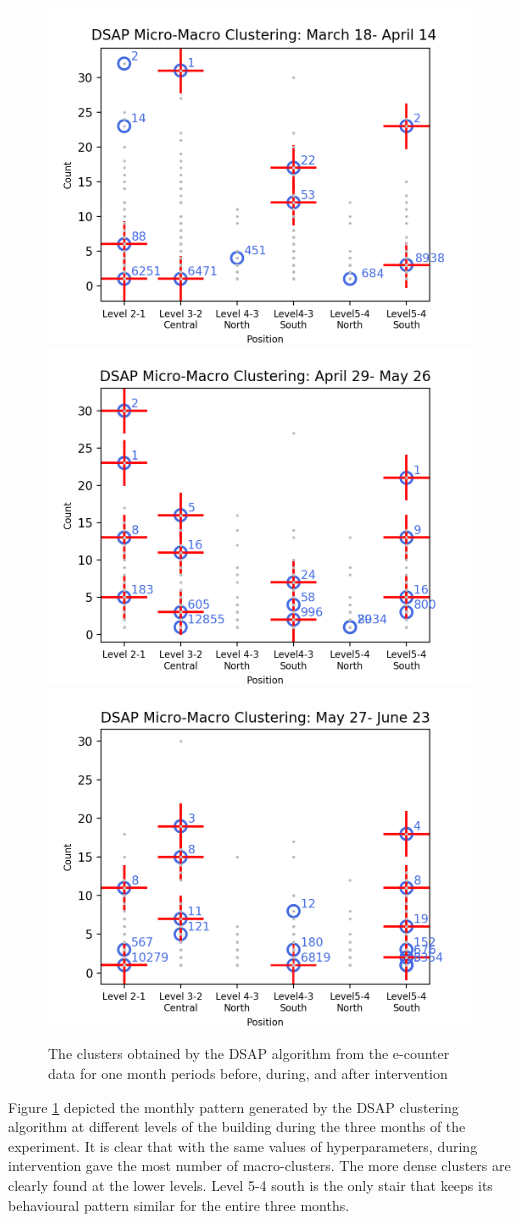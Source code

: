\begin{figure}[!t]
    \centering
    \includegraphics[width=.47\textwidth]{image/Chapters/Chapter6/BeforeInte1month.png}
    \includegraphics[width=.47\textwidth]{image/Chapters/Chapter6/duringInte1month.png}
    \includegraphics[width=.47\textwidth]{image/Chapters/Chapter6/afterInte1month.png}
    \caption{The clusters obtained by the DSAP algorithm from the e-counter data for one month periods before, during, and after intervention}
    \label{dsap3mon}
\end{figure}

Figure \ref{dsap3mon} depicted the monthly pattern generated by the DSAP clustering algorithm at different levels of the building during the three months of the experiment. It is clear that with the same values of hyperparameters, during intervention gave the most number of macro-clusters. The more dense clusters are clearly found at the lower levels. Level 5-4 south is the only stair that keeps its behavioural pattern similar for the entire three months.   

